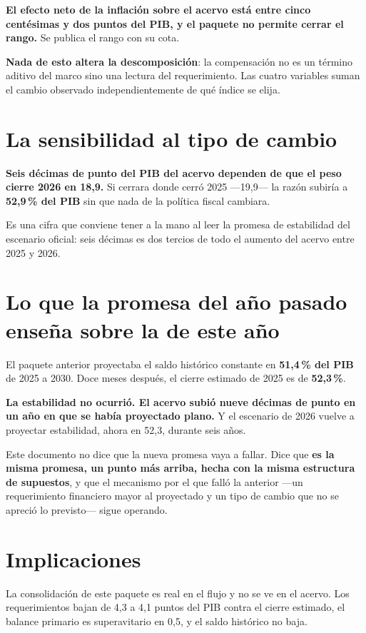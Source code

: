 \textbf{El efecto neto de la inflación sobre el acervo está entre cinco centésimas y dos
puntos del PIB, y el paquete no permite cerrar el rango.} Se publica el rango con su cota.

\textbf{Nada de esto altera la descomposición}: la compensación no es un término aditivo del
marco sino una lectura del requerimiento. Las cuatro variables suman el cambio observado
independientemente de qué índice se elija.

\section{La sensibilidad al tipo de cambio}

\textbf{Seis décimas de punto del PIB del acervo dependen de que el peso cierre 2026 en 18,9.}
Si cerrara donde cerró 2025 ---19,9--- la razón subiría a \textbf{52,9\,\% del PIB} sin que
nada de la política fiscal cambiara.

Es una cifra que conviene tener a la mano al leer la promesa de estabilidad del escenario
oficial: seis décimas es dos tercios de todo el aumento del acervo entre 2025 y 2026.

\section{Lo que la promesa del año pasado enseña sobre la de este año}

El paquete anterior proyectaba el saldo histórico constante en \textbf{51,4\,\% del PIB} de
2025 a 2030. Doce meses después, el cierre estimado de 2025 es de \textbf{52,3\,\%}.

\textbf{La estabilidad no ocurrió. El acervo subió nueve décimas de punto en un año en que se
había proyectado plano.} Y el escenario de 2026 vuelve a proyectar estabilidad, ahora en 52,3,
durante seis años.

Este documento no dice que la nueva promesa vaya a fallar. Dice que \textbf{es la misma
promesa, un punto más arriba, hecha con la misma estructura de supuestos}, y que el
mecanismo por el que falló la anterior ---un requerimiento financiero mayor al proyectado y un
tipo de cambio que no se apreció lo previsto--- sigue operando.

\section{Implicaciones}

La consolidación de este paquete es real en el flujo y no se ve en el acervo. Los
requerimientos bajan de 4,3 a 4,1 puntos del PIB contra el cierre estimado, el balance
primario es superavitario en 0,5, y el saldo histórico no baja.

